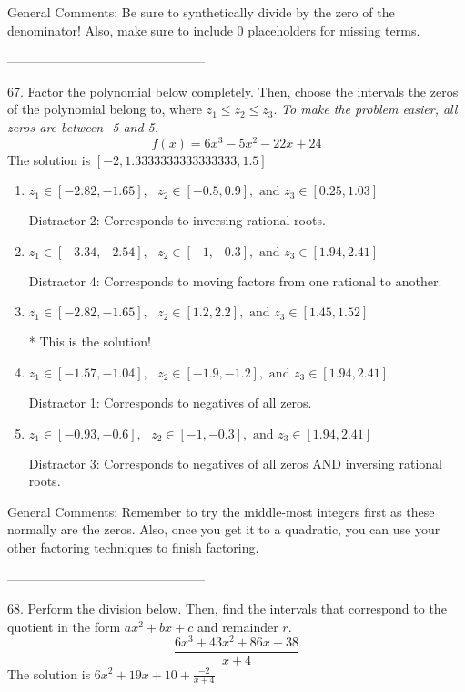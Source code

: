 \documentclass{extbook}[14pt]
\begin{document}
General Comments: Be sure to synthetically divide by the zero of the denominator! Also, make sure to include 0 placeholders for missing terms.

-----------------------------------------------

67. Factor the polynomial below completely. Then, choose the intervals the zeros of the polynomial belong to, where $z_1 \leq z_2 \leq z_3$. \textit{To make the problem easier, all zeros are between -5 and 5.}
\[ f(x) = 6x^{3} -5 x^{2} -22 x + 24 \] 
The solution is $ [-2, 1.3333333333333333, 1.5] $ 

\begin{enumerate}[label=\Alph*.] 
\item $ z_1 \in [-2.82, -1.65], \text{   }  z_2 \in [-0.5, 0.9], \text{   and   } z_3 \in [0.25, 1.03] $ 

  Distractor 2: Corresponds to inversing rational roots. 
\item $ z_1 \in [-3.34, -2.54], \text{   }  z_2 \in [-1, -0.3], \text{   and   } z_3 \in [1.94, 2.41] $ 

  Distractor 4: Corresponds to moving factors from one rational to another. 
\item $ z_1 \in [-2.82, -1.65], \text{   }  z_2 \in [1.2, 2.2], \text{   and   } z_3 \in [1.45, 1.52] $ 

 * This is the solution! 
\item $ z_1 \in [-1.57, -1.04], \text{   }  z_2 \in [-1.9, -1.2], \text{   and   } z_3 \in [1.94, 2.41] $ 

  Distractor 1: Corresponds to negatives of all zeros. 
\item $ z_1 \in [-0.93, -0.6], \text{   }  z_2 \in [-1, -0.3], \text{   and   } z_3 \in [1.94, 2.41] $ 

  Distractor 3: Corresponds to negatives of all zeros AND inversing rational roots. 
\end{enumerate} 
 
General Comments: Remember to try the middle-most integers first as these normally are the zeros. Also, once you get it to a quadratic, you can use your other factoring techniques to finish factoring.

-----------------------------------------------

68. Perform the division below. Then, find the intervals that correspond to the quotient in the form $ax^2+bx+c$ and remainder $r$.
\[ \frac{6x^{3} +43 x^{2} +86 x + 38}{x + 4} \] 
The solution is $ 6x^{2} +19 x + 10 + \frac{-2}{x + 4} $ 
\end{document}
